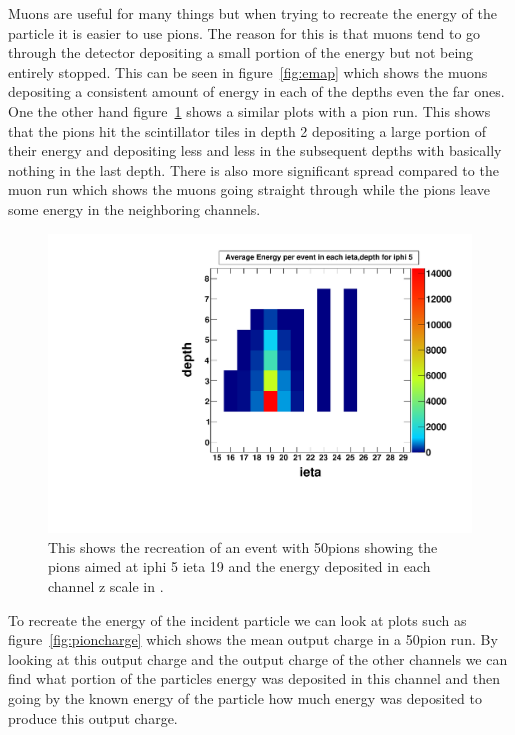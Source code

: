 Muons are useful for many things but when trying to recreate the energy of the particle it is easier to use pions. The reason for this is that muons tend to go through the detector depositing a small portion of the energy but not being entirely stopped. This can be seen in figure~\ref{fig:emap} which shows the muons depositing a consistent amount of energy in each of the depths even the far ones. One the other hand figure~\ref{fig:pionmap} shows a similar plots with a pion run. This shows that the pions hit the scintillator tiles in depth 2 depositing a large portion of their energy and depositing less and less in the subsequent depths with basically nothing in the last depth. There is also more significant spread compared to the muon run which shows the muons going straight through while the pions leave some energy in the neighboring channels.

\begin{figure}
\centering
\includegraphics[width=0.7\linewidth]{Figures/pionrun.pdf}
\caption{This shows the recreation of an event with 50\GeV pions showing the pions aimed at iphi 5 ieta 19 and the energy deposited in each channel z scale in \MeV.}
\label{fig:pionmap}
\end{figure}

To recreate the energy of the incident particle we can look at plots such as figure~\ref{fig:pioncharge} which shows the mean output charge in a 50\GeV\space pion run. By looking at this output charge and the output charge of the other channels we can find what portion of the particles energy was deposited in this channel and then going by the known energy of the particle how much energy was deposited to produce this output charge. 

